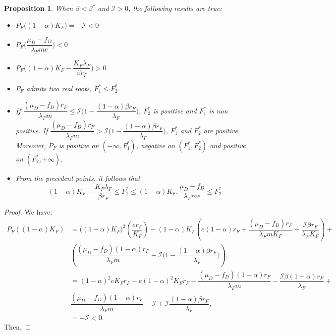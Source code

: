 \documentclass{article}
\newcommand{\lfw}{\lambda_{F}}
\newcommand{\lfw}{\lambda_{F}}
\newcommand{\cI}{\mathcal{I}}
\newtheorem{prop}{Proposition}
\begin{document}
\begin{appendix}
\begin{prop}\label{prop:study of PF}
When $\beta < \beta^*$ and $\cI > 0$, the following results are true:
\begin{itemize}
\item $P_F\Big((1-\alpha)K_F\Big) = -\cI < 0$
\item $P_F\Big(\dfrac{\mu_D - f_D}{\lfw m e}\Big) < 0$
\item $P_F\Big((1-\alpha)K_F - \dfrac{K_F \lfw}{\beta r_F}\Big) > 0$
\item $P_F$ admits two real roots, $F_1^* \leq F_2^*$. 
\item If $\dfrac{(\mu_D - f_D) r_F}{\lfw m } \leq \cI\Big(1 - \dfrac{(1-\alpha)\beta r_F}{\lfw} \Big)$,  $F_2^*$ is positive and $F_1^*$ is non positive. If $\dfrac{(\mu_D - f_D) r_F}{\lfw m } > \cI\Big(1 - \dfrac{(1-\alpha)\beta r_F}{\lfw} \Big)$, $F^*_1$ and $F^*_2$ are positive. Moreover, $P_F$ is positive on $(-\infty, F_1^*)$, negative on $(F^*_1, F^*_2)$ and positive on $(F^*_2, +\infty)$.
\item From the precedent points, it follows that $$(1-\alpha)K_F - \dfrac{K_F \lfw}{\beta r_F} \leq F^*_1 \leq (1-\alpha)K_F, \dfrac{\mu_D - f_D}{\lfw m e} \leq F_2^* $$
\end{itemize}

\end{prop}

\begin{proof}
We have:
\begin{align*}
P_F((1-\alpha) K_F) &= \Big((1-\alpha) K_F \Big)^2 \left(\dfrac{er_F}{K_F} \right) - (1-\alpha) K_F \left(e(1-\alpha)r_F + \dfrac{(\mu_D - f_D) r_F}{\lfw m K_F} + \dfrac{\cI \beta r_F}{\lfw K_F} \right) + \\ &\left(\dfrac{(\mu_D - f_D)(1-\alpha) r_F}{\lfw m} - \cI\Big(1 - \dfrac{(1-\alpha)\beta r_F}{\lfw} \Big) \right), \\
&=(1-\alpha)^2 e K_F r_F - e(1-\alpha)^2 K_F r_F - \dfrac{(\mu_D - f_D) (1-\alpha) r_F}{\lfw m} - \dfrac{\cI \beta (1-\alpha)r_F}{\lfw}  + \\ &\dfrac{(\mu_D - f_D)(1-\alpha) r_F}{\lfw m} - \cI +\cI \dfrac{(1-\alpha)\beta r_F}{\lfw}, \\
&= -\cI< 0.
\end{align*}
Then, 


\end{proof}
\end{appendix}
\end{document}
